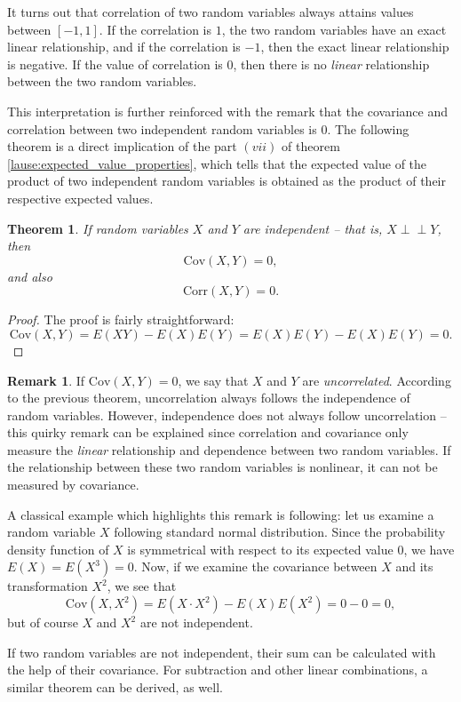\documentclass[12pt,a4paper,leqno]{report}
\newcommand{\cov}{\mathrm{Cov}}
\newcommand{\corr}{\mathrm{Corr}}
\def\independent{\perp\!\!\!\perp}
\theoremstyle{plain}
\newtheorem{lause}[equation]{Theorem}
\theoremstyle{definition}
\newtheorem{remark}[equation]{Remark}
\begin{document}
It turns out that correlation of two random variables always attains values between $[-1,1]$. If the correlation is $1$, the two random variables have an exact linear relationship, and if the correlation is $-1$, then the exact linear relationship is negative. If the value of correlation is $0$, then there is no \emph{linear} relationship between the two random variables.

This interpretation is further reinforced with the remark that the covariance and correlation between two independent random variables is $0$. The following theorem is a direct implication of the part $(vii)$ of theorem \ref{lause:expected_value_properties}, which tells that the expected value of the product of two independent random variables is obtained as the product of their respective expected values.

\begin{lause}
\label{lause:non-corr}
If random variables $X$ and $Y$ are independent -- that is, $X \independent Y$, then
\[
\cov(X,Y) = 0,
\] 
and also 
\[
\corr(X,Y) = 0.
\]
\end{lause}

\begin{proof}
The proof is fairly straightforward: 
\[
\cov(X,Y) = E(XY) - E(X)E(Y) = E(X)E(Y) - E(X)E(Y) = 0.
\]
\end{proof}

\begin{remark}
If $\cov(X,Y) = 0$, we say that $X$ and $Y$ are \emph{uncorrelated}. According to the previous theorem, uncorrelation always follows the independence of random variables. However, independence does not always follow uncorrelation -- this quirky remark can be explained since correlation and covariance only measure the \emph{linear} relationship and dependence between two random variables. If the relationship between these two random variables is nonlinear, it can not be measured by covariance.

A classical example which highlights this remark is following: let us examine a random variable $X$ following standard normal distribution. Since the probability density function of $X$ is symmetrical with respect to its expected value $0$, we have $E(X) = E(X^3) = 0$. Now, if we examine the covariance between $X$ and its transformation $X^2$, we see that 
\[
\cov(X,X^2) = E(X \cdot X^2) -  E(X)E(X^2) = 0 - 0 = 0,
\]
but of course $X$ and $X^2$ are not independent.
\end{remark}

If two random variables are not independent, their sum can be calculated with the help of their covariance. For subtraction and other linear combinations, a similar theorem can be derived, as well. 
\end{document}
